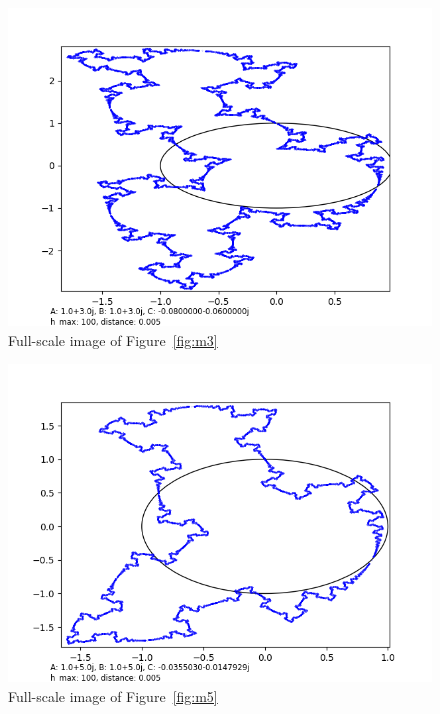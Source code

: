 \documentclass[12pt,a4paper,reqno,parskip=full]{amsart}
\numberwithin{equation}{section}
\theoremstyle{plain}
\theoremstyle{definition}
\begin{document}
\begin{figure}[H]
    \centering
    \includegraphics[width=\textwidth]{images/m/a3,b3,h100,d.005.png}
    \caption{Full-scale image of Figure~\ref{fig:m3}}
\end{figure}

\begin{figure}[H]
    \centering
    \includegraphics[width=\textwidth]{images/m/a5,b5,h100,d.005.png}
    \caption{Full-scale image of Figure~\ref{fig:m5}}
\end{figure}
\end{document}
